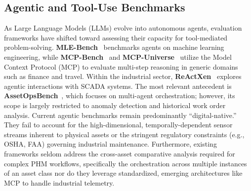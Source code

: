 \documentclass[sigconf,review]{acmart}
\begin{document}
\subsection{Agentic and Tool-Use Benchmarks}
As Large Language Models (LLMs) evolve into autonomous agents, evaluation frameworks have shifted toward assessing their capacity for tool-mediated problem-solving. \textbf{MLE-Bench}~\cite{chan2025mlebenchevaluatingmachinelearning} benchmarks agents on machine learning engineering, while \textbf{MCP-Bench}~\cite{wang2025mcpbenchbenchmarkingtoolusingllm} and \textbf{MCP-Universe}~\cite{luo2025mcpuniversebenchmarkinglargelanguage} utilize the Model Context Protocol (MCP) to evaluate multi-step reasoning in generic domains such as finance and travel. Within the industrial sector, \textbf{ReActXen}~\cite{patel2025react} explores agentic interactions with SCADA systems. The most relevant antecedent is \textbf{AssetOpsBench}~\cite{patel2025assetopsbenchbenchmarkingaiagents}, which focuses on multi-agent orchestration; however, its scope is largely restricted to anomaly detection and historical work order analysis. Current agentic benchmarks remain predominantly ``digital-native.'' They fail to account for the high-dimensional, temporally-dependent sensor streams inherent to physical assets or the stringent regulatory constraints (e.g., OSHA, FAA) governing industrial maintenance. Furthermore, existing frameworks seldom address the cross-asset comparative analysis required for complex PHM workflows, specifically the orchestration across multiple instances of an asset class nor do they leverage standardized, emerging architectures like MCP to handle industrial telemetry.
\end{document}
